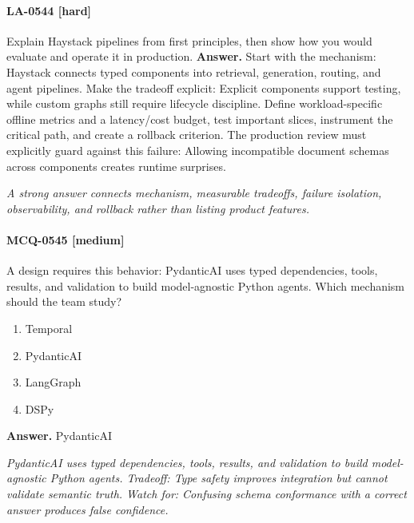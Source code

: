 \paragraph{LA-0544 [hard]} Explain Haystack pipelines from first principles, then show how you would evaluate and operate it in production.
\noindent\textbf{Answer.} Start with the mechanism: Haystack connects typed components into retrieval, generation, routing, and agent pipelines. Make the tradeoff explicit: Explicit components support testing, while custom graphs still require lifecycle discipline. Define workload-specific offline metrics and a latency/cost budget, test important slices, instrument the critical path, and create a rollback criterion. The production review must explicitly guard against this failure: Allowing incompatible document schemas across components creates runtime surprises.
\par\textit{A strong answer connects mechanism, measurable tradeoffs, failure isolation, observability, and rollback rather than listing product features.}
\paragraph{MCQ-0545 [medium]} A design requires this behavior: PydanticAI uses typed dependencies, tools, results, and validation to build model-agnostic Python agents. Which mechanism should the team study?
\begin{enumerate}[label=\Alph*.]
\item Temporal
\item PydanticAI
\item LangGraph
\item DSPy
\end{enumerate}
\noindent\textbf{Answer.} PydanticAI
\par\textit{PydanticAI uses typed dependencies, tools, results, and validation to build model-agnostic Python agents. Tradeoff: Type safety improves integration but cannot validate semantic truth. Watch for: Confusing schema conformance with a correct answer produces false confidence.}
